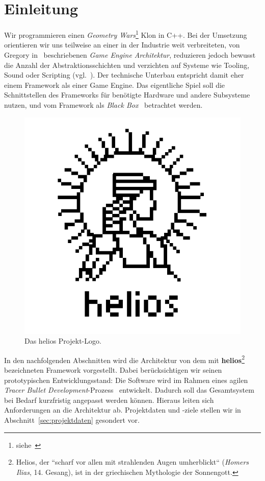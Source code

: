 \section{Einleitung}

Wir programmieren einen \textit{Geometry Wars}\footnote{siehe~\cite[]{WikipediaGeometryWars}} Klon in C++.
Bei der Umsetzung orientieren wir uns teilweise an einer in der Industrie weit verbreiteten, von Gregory in~\cite[]{Gre19} beschriebenen \textit{Game Engine Architektur}, reduzieren jedoch bewusst die Anzahl der Abstraktionsschichten und verzichten auf Systeme wie Tooling, Sound oder Scripting (vgl.~\cite[\textbf{Figure 1.16}, 39]{Gre19}).
Der technische Unterbau entspricht damit eher einem Framework als einer Game Engine.
Das eigentliche Spiel soll die Schnittstellen des Frameworks für benötigte Hardware und andere Subsysteme nutzen, und vom Framework als \textit{Black Box}~\cite[]{RB88} betrachtet werden.

\begin{figure}[tbp]
    \centering
    \includegraphics[width=0.5\columnwidth]{img/helios_logo}
    \caption{Das helios Projekt-Logo.}
    \label{fig:helios_logo}
\end{figure}

In den nachfolgenden Abschnitten wird die Architektur von dem mit \textbf{helios}\footnote{
    Helios, der ``scharf vor allen mit strahlenden Augen umherblickt`` (\textit{Homers Ilias}, 14. Gesang), ist in der griechischen Mythologie der Sonnengott.
} bezeichneten Framework vorgestellt.
Dabei berücksichtigen wir seinen prototypischen Entwicklungsstand:
Die Software wird im Rahmen eines agilen \textit{Tracer Bullet Development}-Prozess~\cite[50 f.]{TH20} entwickelt.
Dadurch soll das Gesamtsystem bei Bedarf kurzfristig angepasst werden können.
Hieraus leiten sich Anforderungen an die Architektur ab.
Projektdaten und -ziele stellen wir in Abschnitt~\ref{sec:projektdaten} gesondert vor.\par

